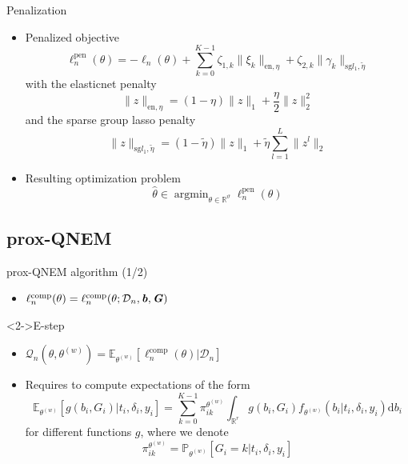 \documentclass{beamer}
\DeclareMathOperator{\argmin}{argmin}
\newcommand{\dd}{\mathrm{d}}
\newcommand{\E}{\mathbb E}
\newcommand{\R}{\mathbb R}
\renewcommand{\P}{\mathds{P}}
\newcommand{\norm}[1]{\|#1\|}
\newcommand{\cD}{\mathcal D}
\newcommand{\cQ}{\mathcal Q}
\renewcommand{\P}{\mathds P}
\begin{document}
\begin{frame}{Penalization}

\small

\begin{itemize}
  \item<1-> Penalized objective
  \begin{equation*}
  \ell_n^\text{pen}(\theta) = - \ell_n(\theta) + \sum_{k=0}^{K-1} \zeta_{1,k} \norm{\xi_k}_{\text{en}, \eta} + \zeta_{2,k} \norm{\gamma_k}_{\text{sg} l_1, \tilde{\eta}}
  \end{equation*}
  with the elasticnet penalty \[ \norm{z}_{\text{en}, \eta} = (1-\eta)\norm{z}_1 + \dfrac\eta2 \norm{z}_2^2 \] and the sparse group lasso penalty \[ \norm{z}_{\text{sg} l_1, \tilde{\eta}} = (1-\tilde{\eta})\norm{z}_1 + \tilde{\eta} \sum_{l=1}^L\norm{z^l}_2 \]
  \item<2-> Resulting optimization problem \[\hat \theta \in \argmin_{\theta \in \R^\vartheta} \ell_n^\text{pen}(\theta)\]
\end{itemize}

\end{frame}

\subsection{prox-QNEM}

\begin{frame}{prox-QNEM algorithm (1/2)}

\small

\begin{itemize}
  \item<1-> $\ell_n^\text{comp}(\theta) = \ell_n^\text{comp}(\theta ; \cD_n, \textbf{\textit{b}}, \textbf{\textit{G}})$
\end{itemize}

\begin{block}<2->{E-step}
\begin{itemize}
  \item<2-> $\cQ_n(\theta, \theta^{(w)}) = \E_{\theta^{(w)}}[\ell_n^\text{comp}(\theta) | \cD_n]$
  \item<3-> Requires to compute expectations of the form
  \footnotesize
\[ \E_{\theta^{(w)}}[ g(b_i, G_i) | t_i, \delta_i, y_i] = \sum_{k=0}^{K-1} \pi_{ik}^{\theta^{(w)}} \int_{\R^r} g(b_i, G_i) f_{\theta^{(w)}}(b_i | t_i, \delta_i, y_i) \dd b_i \] 
\small for different functions $g$, where we denote 
\[\pi_{ik}^{\theta^{(w)}} = \P_{\theta^{(w)}}[G_i = k | t_i, \delta_i, y_i] \]
\end{itemize}
\end{block}


\end{frame}
\end{document}
